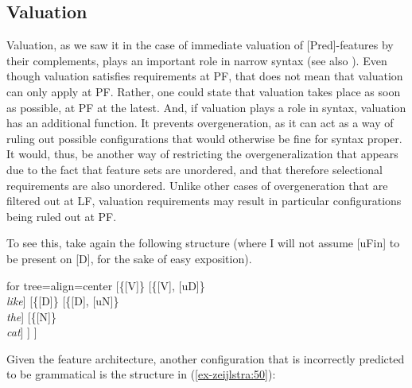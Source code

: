 \documentclass[output=paper
,modfonts
,nonflat]{langsci/langscibook}
\begin{document}
\subsection{Valuation} \label{sec-zeijlstra:4.3}
Valuation, as we saw it in the case of immediate valuation of [Pred]-features by their complements, plays an important role in narrow syntax (see also \citealt{Bjorkman_ZeijlstraTA}). Even though valuation satisfies requirements at PF, that does not mean that valuation can only apply at PF. Rather, one could state that valuation takes place as soon as possible, at PF at the latest. And, if valuation plays a role in syntax, valuation has an additional function. It prevents overgeneration, as it can act as a way of ruling out possible configurations that would otherwise be fine for syntax proper. It would, thus, be another way of restricting the overgeneralization that appears due to the fact that feature sets are unordered, and that therefore selectional requirements are also unordered. Unlike other cases of overgeneration that are filtered out at LF, valuation requirements may result in particular configurations being ruled out at PF.

To see this, take again the following structure (where I will not assume [uFin] to be present on [D], for the sake of easy exposition).

\ea \label{ex-zeijlstra:49}
			\begin{forest}	for tree={align=center}
				[\{{[}V{]}\}
				[\{{[}V{]}{,} {[}uD{]}\}\\ \textit{like}]
				[\{{[}D{]}\}
				[\{{[}D{]}{,} {[}uN{]}\}\\ \textit{the}]
				[\{{[}N{]}\}\\ \textit{cat}]
				] ] 
		\end{forest}\z
\noindent Given the feature architecture, another configuration that is incorrectly predict\-ed to be grammatical is the structure in (\ref{ex-zeijlstra:50}):
\end{document}
